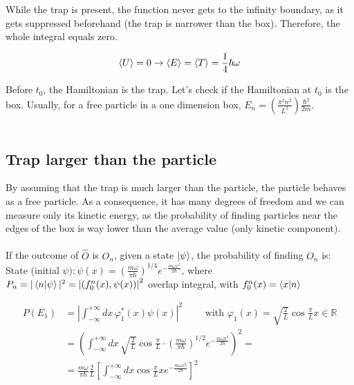 \noindent
While the trap is present, the function never gets to the infinity boundary, as it gets suppressed beforehand (the trap is narrower than the box).
Therefore, the whole integral equals zero.

$$\expval{U}=0 \rightarrow \expval{E}=\expval{T}=\frac{1}{4} \hbar \omega $$

\noindent
Before $t_0$, the Hamiltonian is the trap.
Let's check if the Hamiltonian at $t_0$ is the box.
Usually, for a free particle in a one dimension box,  $E_n=\left(\frac{\pi^{2}n^2}{L^2}\right)\frac{\hbar^{2}}{2 m}$.\\
\\

	\subsection{Trap larger than the particle}
	By assuming that the trap is much larger than the particle, the particle behaves as a free particle.
	As a consequence, it has many degrees of freedom and we can measure only its kinetic energy, as the probability of finding particles near the edges of the box is way lower than the average value (only kinetic component).\\
	\\
	\noindent
	If the outcome of $\hat{O}$ is $O_n$, given a state $\ket{\psi}$, the probability of finding $O_n$ is:
	\\
	State (initial $\psi): \psi(x)=\left(\frac{m \omega}{ \pi \hbar}\right)^{1 / 4} e^{-\frac{m \omega x^{2}}{2 \hbar}}$, where $P_{n}=|\bra{n} \ket{\psi}|^{2}=\left|\left(f_{0}^{n}(x), \psi(x)\right)\right|^{2}$ overlap integral, with $f_{0}^{n}(x)=\bra{x}\ket{n}$

	\begin{align*}
		P\left(E_{1}\right)&=\left|\int_{-\infty}^{+\infty} d x\, \varphi_{1}^{*}(x) \psi(x)\right|^{2}\qquad \text{ with }\varphi_{1}(x)=\sqrt{\frac{2}{L}} \cos \frac{\pi}{L}x \in \mathbb{R}\\
		&=\left(\int_{-\infty}^{+\infty} d x\,\sqrt{\frac{2}{L}} \cos \frac{\pi}{L} \cdot \left(\frac{m \omega}{ \pi \hbar}\right)^{1 / 2} e^{-\frac{m \omega x^{2}}{2 \hbar}}\right)^{2}=\\
															&=\frac{m \omega}{ \pi \hbar}\frac{2}{L} \left[\int_{-\infty}^{+\infty} d x \cos \frac{\pi}{L} x e^{-\frac{m \omega x^{2}}{2 \hbar}}\right]^{2}
	\end{align*}

	\noindent

